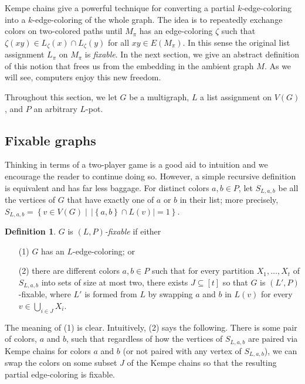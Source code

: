 \documentclass[12pt]{article}
\theoremstyle{plain}
\theoremstyle{definition}
\newtheorem{defn}{Definition}
\theoremstyle{remark}
\newcommand{\set}[1]{\left\{ #1 \right\}}
\newcommand{\setb}[3]{\left\{ #1 \in #2 \mid #3 \right\}}
\newcommand{\card}[1]{\left|#1\right|}
\newcommand{\irange}[1]{\left[#1\right]}
\begin{document}
Kempe chains give a powerful technique for converting a partial
$k$-edge-coloring into a $k$-edge-coloring of the whole graph.  The idea is to repeatedly
exchange colors on two-colored paths until $M_\pi$ has an edge-coloring $\zeta$
such that $\zeta(xy) \in L_\zeta(x) \cap L_\zeta(y)$ for all $xy \in E(M_\pi)$.
 In this sense the original list assignment $L_\pi$ on $M_\pi$ is
\emph{fixable}. In the next section, we give an abstract definition of this
notion that frees us from the embedding in the ambient graph $M$.  As we will
see, computers enjoy this new freedom.

Throughout this section, we let $G$ be a multigraph, $L$ a list assignment on
$V(G)$, and $P$ an arbitrary $L$-pot.  

\subsection{Fixable graphs}
Thinking in terms of a two-player game is a good aid to intuition and we
encourage the reader to continue doing so. However, a simple recursive
definition is equivalent and has far less baggage. For distinct colors $a,b
\in P$, let $S_{L,a,b}$ be all the vertices of $G$ that have exactly one of $a$
or $b$ in their list; more precisely, $S_{L,a,b} =
\setb{v}{V(G)}{\,\card{\set{a,b} \cap L(v)} = 1}$.  

\begin{defn}
$G$ is \emph{$(L, P)$-fixable} if either
\begin{enumerate}
\item[(1)] $G$ has an $L$-edge-coloring; or
\item[(2)] there are different colors $a,b \in P$ such that for every partition
$X_1, \ldots, X_t$ of $S_{L,a,b}$ into sets of size at most two, there exists $J
\subseteq \irange{t}$ so that $G$ is $(L', P)$-fixable, where $L'$ is formed
from $L$ by swapping $a$ and $b$ in $L(v)$ for every $v \in \bigcup_{i \in J} X_i$.
\end{enumerate}
\end{defn}

The meaning of (1) is clear.  Intuitively, (2) says the following.  There is
some pair of colors, $a$ and $b$, such that regardless of how the vertices of
$S_{L,a,b}$ are paired via Kempe chains for colors $a$ and $b$ (or not paired
with any vertex of $S_{L,a,b}$), we can swap the colors on some subset $J$ of
the Kempe chains so that the resulting partial edge-coloring is fixable.
\end{document}
